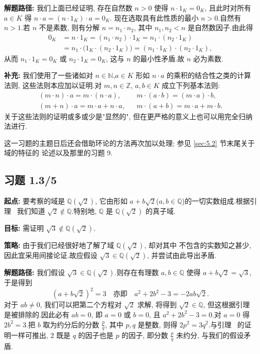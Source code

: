 \noindent\textbf{解题路径:} 我们上面已经证明, 存在自然数 $n > 0$ 使得
$n \cdot 1_K = 0_K$, 且此时对所有 $a \in K$ 得 $n \cdot a = (n \cdot 1_K) \cdot a = 0_K$.
现在选取具有此性质的最小 $n > 0$.自然有 $n > 1$.若 $n$ 不是素数, 则有分解
$n = n_1 \cdot n_2$, 其中 $n_1, n_2 < n$ 是自然数因子.由此得
\[
\begin{aligned}
0_K &= n \cdot 1_K = (n_1 \cdot n_2) \cdot 1_K = n_1 \cdot (n_2 \cdot 1_K) \\
&= n_1 \cdot \bigl( 1_K \cdot (n_2 \cdot 1_K) \bigr) = (n_1 \cdot 1_K) \cdot (n_2 \cdot 1_K),
\end{aligned}
\]
从而 $n_1 \cdot 1_K = 0_K$ 或 $n_2 \cdot 1_K = 0_K$, 这与 $n$ 的最小性矛盾.故 $n$
必为素数.

\noindent\textbf{补充:} 我们使用了一些诸如对 $n \in \mathbb{N}$,$a \in K$ 形如
$n \cdot a$ 的乘积的结合性之类的计算法则, 这些法则本应加以证明.对
$m, n \in \mathbb{Z}$, $a, b \in K$ 成立下列基本法则:
\[
\begin{array}{rcl}
(m \cdot n) \cdot a = m \cdot (n \cdot a), & & m \cdot (a \cdot b) = (m \cdot a) \cdot b, \\
(m + n) \cdot a = m \cdot a + n \cdot a, & & m \cdot (a + b) = m \cdot a + m \cdot b\text{.}
\end{array}
\]
关于这些法则的证明或多或少是"显然的", 但在更严格的意义上也可以用完全归纳法进行.

这一习题的主题日后还会借助环论的方法再次加以处理; 参见 \ref{sec:5.2} 节末尾关于域的特征的
论述以及那里的习题 9.

\subsection*{习题 1.3/5}

\noindent\textbf{起点:} 要考察的域是 $\mathbb{Q}(\sqrt{2})$, 它由形如
$a + b\sqrt{2}$($a, b \in \mathbb{Q}$)的一切实数组成.根据引理~
我们知道 $\sqrt{2} \notin \mathbb{Q}$.特别地, $\mathbb{Q}$ 是
$\mathbb{Q}(\sqrt{2})$ 的真子域.

\noindent\textbf{目标:} 需证明 $\sqrt{3} \notin \mathbb{Q}(\sqrt{2})$.

\noindent\textbf{策略:} 由于我们已经很好地了解了域 $\mathbb{Q}(\sqrt{2})$, 却对其中
不包含的实数知之甚少, 因此宜采用间接论证.故应假设
$\sqrt{3} \in \mathbb{Q}(\sqrt{2})$, 并尝试由此导出矛盾.

\noindent\textbf{解题路径:} 我们假设 $\sqrt{3} \in \mathbb{Q}(\sqrt{2})$.则存在有理数
$a, b \in \mathbb{Q}$ 使得 $a + b\sqrt{2} = \sqrt{3}$, 于是得到
\[
(a + b\sqrt{2})^2 = 3 \quad \text{亦即} \quad a^2 + 2b^2 - 3 = -2ab\sqrt{2}\text{.}
\]
对于 $ab \neq 0$, 我们可以把第二个方程对 $\sqrt{2}$ 求解, 将得到
$\sqrt{2} \in \mathbb{Q}$, 但这根据引理~ 是被排除的.因此必有
$ab = 0$, 即 $a = 0$ 或 $b = 0$, 且 $a^2 + 2b^2 - 3 = 0$.对 $a = 0$ 得
$2b^2 = 3$.把 $b$ 取为约分后的分数 $\frac{p}{q}$, 其中 $p, q$ 是整数, 则得
$2p^2 = 3q^2$.与引理~ 的证明一样可推出, $2$ 既是 $q$ 的因子也是
$p$ 的因子, 即分数 $\frac{p}{q}$ 未约分, 与我们的假设矛盾.

